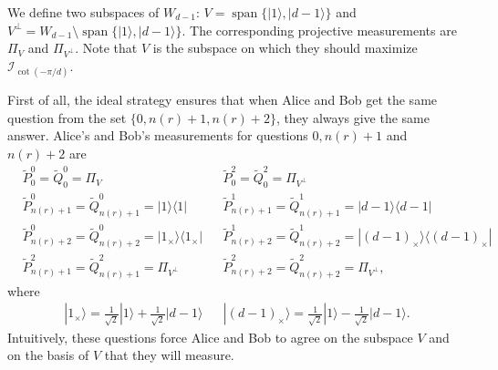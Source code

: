 \documentclass[11pt,letterpaper]{article}
\newcommand{\ket}[1]{|#1\rangle}
\newcommand{\ketbra}[2]{|#1\rangle\langle#2|}
\DeclareMathOperator{\spn}{span}
\newcommand{\1}{\mathbb{1}}
\newcommand{\tP}{\tilde{P}}
\newcommand{\tQ}{\tilde{Q}}
\newcommand{\nr}{n(r)}
\newcommand{\I}{\mathcal{I}}
\theoremstyle{definition}
\begin{document}
We define two subspaces of $W_{d-1}$: $V = \spn\{\ket{1}, \ket{d-1}\}$ and $V^\perp = W_{d-1} \setminus\spn\{\ket{1}, \ket{d-1}\}$.
The corresponding projective measurements are $\Pi_V$ and $\Pi_{V^\perp}$. Note that $V$ is the subspace on which they should maximize $\I_{\cot(-\pi/d)}$.

First of all, the ideal strategy ensures that when 
Alice and Bob get the same question from the set $\{0,\nr+1,\nr+2\}$, they always give the same answer.
Alice's and Bob's measurements for questions $0, \nr+1$ and $\nr+2$ are
\begin{align*}
	&\tP_0^0 = \tQ_0^0 = \Pi_V && \tP_0^2 = \tQ_0^2 = \Pi_{V^\perp} \\
	&\tP_{\nr+1}^0 = \tQ_{\nr+1}^0 = \ketbra{1}{1} &&
	\tP_{\nr+1}^1 = \tQ_{\nr+1}^1 = \ketbra{d-1}{d-1} \\
	&\tP_{\nr+2}^0 = \tQ_{\nr+2}^0 = \ketbra{1_{\times}}{1_{\times}} && \tP_{\nr+2}^1 = \tQ_{\nr+2}^1 = \ketbra{(d-1)_{\times}}{(d-1)_{\times}} \\
	&\tP_{\nr+1}^2 = \tQ_{\nr+1}^2 = \Pi_{V^\perp} &&
	 \tP_{\nr+2}^2 = \tQ_{\nr+2}^2 = \Pi_{V^\perp},
\end{align*}
where
\begin{align*}
    \ket{1_{\times}} = \frac{1}{\sqrt{2}}\ket{1} + \frac{1}{\sqrt{2}}\ket{d-1}
	&&\ket{(d-1)_{\times}} = \frac{1}{\sqrt{2}}\ket{1} - \frac{1}{\sqrt{2}}\ket{d-1}.
\end{align*}
Intuitively, these questions force Alice and Bob to agree on the subspace $V$ and
on the basis of $V$ that they will measure.
\end{document}
